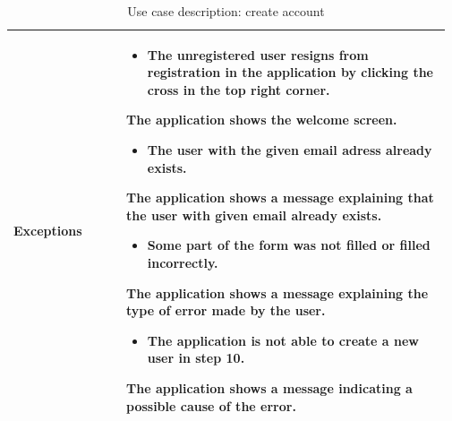 \begin{table}[H]
\begin{tabular}{@{}p{0.25\linewidth} p{0.72\linewidth}@{}}
		\textbf{Exceptions}         & \begin{itemize}[leftmargin=.4cm,noitemsep,topsep=0pt,before=\vspace{-3mm}]
		   \item The unregistered user resigns from registration in the application by clicking the cross in the top right corner. 
		\end{itemize}
		The application shows the welcome screen.
		\begin{itemize}[leftmargin=.4cm,noitemsep,topsep=0pt]
		   \item The user with the given email adress already exists. 
		\end{itemize}
		The application shows a message explaining that the user with given email already exists.
		\begin{itemize}[leftmargin=.4cm,noitemsep,topsep=0pt]
		   \item Some part of the form was not filled or filled incorrectly.
		\end{itemize}
		The application shows a message explaining the type of error made by the user.
	    \begin{itemize}[leftmargin=.4cm,noitemsep,topsep=0pt]
		   \item The application is not able to create a new user in step 10.
		\end{itemize}
		The application shows a message indicating a possible cause of the error.
	    \\\bottomrule
	\end{tabular}
	\caption{Use case description: create account}
\end{table}

